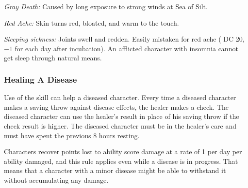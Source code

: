 \textit{Gray Death:} Caused by long exposure to strong winds at Sea of Silt.

\textit{Red Ache:} Skin turns red, bloated, and warm to the touch.

\textit{Sleeping sickness:} Joints swell and redden. Easily mistaken for red ache ( DC 20, $-1$ for each day after incubation). An afflicted character with insomnia cannot get sleep through natural means.

\subsubsection{Healing A Disease}
Use of the  skill can help a diseased character. Every time a diseased character makes a saving throw against disease effects, the healer makes a check. The diseased character can use the healer's result in place of his saving throw if the  check result is higher. The diseased character must be in the healer's care and must have spent the previous 8 hours resting.

Characters recover points lost to ability score damage at a rate of 1 per day per ability damaged, and this rule applies even while a disease is in progress. That means that a character with a minor disease might be able to withstand it without accumulating any damage.